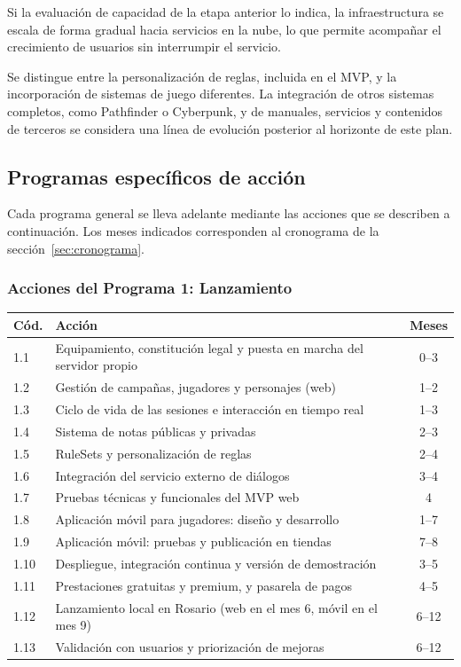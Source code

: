 Si la evaluación de capacidad de la etapa anterior lo indica, la infraestructura se escala de forma gradual hacia servicios en la nube, lo que permite acompañar el crecimiento de usuarios sin interrumpir el servicio.

Se distingue entre la personalización de reglas, incluida en el MVP, y la incorporación de sistemas de juego diferentes. La integración de otros sistemas completos, como Pathfinder o Cyberpunk, y de manuales, servicios y contenidos de terceros se considera una línea de evolución posterior al horizonte de este plan.

\subsection{Programas específicos de acción}
Cada programa general se lleva adelante mediante las acciones que se describen a continuación. Los meses indicados corresponden al cronograma de la sección~\ref{sec:cronograma}.

\subsubsection{Acciones del Programa 1: Lanzamiento}

\begin{center}
\small
\begin{tabularx}{\textwidth}{|l|X|c|}
\hline
\textbf{Cód.} & \textbf{Acción} & \textbf{Meses}\\ \hline
1.1 & Equipamiento, constitución legal y puesta en marcha del servidor propio & 0--3\\ \hline
1.2 & Gestión de campañas, jugadores y personajes (web) & 1--2\\ \hline
1.3 & Ciclo de vida de las sesiones e interacción en tiempo real & 1--3\\ \hline
1.4 & Sistema de notas públicas y privadas & 2--3\\ \hline
1.5 & RuleSets y personalización de reglas & 2--4\\ \hline
1.6 & Integración del servicio externo de diálogos & 3--4\\ \hline
1.7 & Pruebas técnicas y funcionales del MVP web & 4\\ \hline
1.8 & Aplicación móvil para jugadores: diseño y desarrollo & 1--7\\ \hline
1.9 & Aplicación móvil: pruebas y publicación en tiendas & 7--8\\ \hline
1.10 & Despliegue, integración continua y versión de demostración & 3--5\\ \hline
1.11 & Prestaciones gratuitas y premium, y pasarela de pagos & 4--5\\ \hline
1.12 & Lanzamiento local en Rosario (web en el mes 6, móvil en el mes 9) & 6--12\\ \hline
1.13 & Validación con usuarios y priorización de mejoras & 6--12\\ \hline
\end{tabularx}
\end{center}


